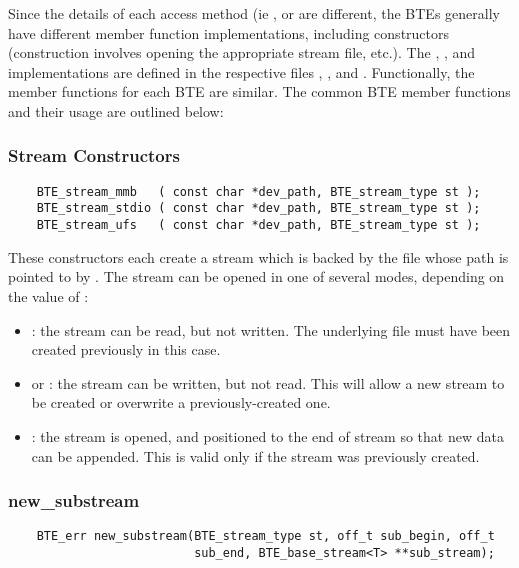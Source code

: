 Since the details of each access method (ie
,  or  are
different, the BTEs generally have different member function
implementations, including constructors (construction
involves opening the appropriate stream file, etc.).
The , , and
 implementations are defined in the
respective files ,
, and .
Functionally, the member functions for each BTE are similar.
The common BTE member functions and their usage are outlined
below:

\subsubsection{Stream Constructors}
\begin{verbatim}
    BTE_stream_mmb   ( const char *dev_path, BTE_stream_type st );
    BTE_stream_stdio ( const char *dev_path, BTE_stream_type st );
    BTE_stream_ufs   ( const char *dev_path, BTE_stream_type st );
\end{verbatim}

These constructors each create a stream which is backed by
the file whose path is pointed to by .  The
stream can be opened in one of several modes, depending on
the value of :

\begin{itemize}

    \item {}: the stream can be read,
    but not written. The underlying file must have been
    created previously in this case.
    \item {} or
    : the stream can be
    written, but not read. This will allow a new stream to
    be created or overwrite a previously-created one.

    \item {}: the stream is opened,
    and positioned to the end of stream so that new data can
    be appended. This is valid only if the stream was
    previously created. 
\end{itemize}

\subsubsection{new\_substream}
\begin{verbatim}
    BTE_err new_substream(BTE_stream_type st, off_t sub_begin, off_t
                          sub_end, BTE_base_stream<T> **sub_stream);
\end{verbatim}

